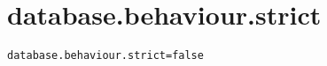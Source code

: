\section{database.behaviour.strict}
\label{configuration:DatabaseBehaviourStrict}
\AvailableInJavaOnly{\TODO}
\begin{lstlisting}[style=Props,caption={Usage example for \textit{database.behaviour.strict}}]
database.behaviour.strict=false
\end{lstlisting}